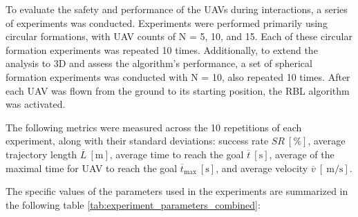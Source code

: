         To evaluate the safety and performance of the \ac{UAV}s during interactions, a series of experiments was conducted. 
        Experiments were performed primarily using circular formations, with \ac{UAV} counts of N = 5, 10, and 15. 
        Each of these circular formation experiments was repeated 10 times.
        Additionally, to extend the analysis to 3D and assess the algorithm's performance, a set of spherical formation experiments was conducted with N = 10, also repeated 10 times.
        After each \ac{UAV} was flown from the ground to its starting position, the \ac{RBL} algorithm was activated.    
        
        The following metrics were measured across the 10 repetitions of each experiment, along with their standard deviations: success rate \( SR \ [\%] \), average trajectory length \( \overline{L} \ [\mathrm{m}] \), 
        average time to reach the goal \( \overline{t} \ [\mathrm{s}] \), average of the maximal time for \ac{UAV} to reach the goal \( \overline{t}_{\text{max}} \ [\mathrm{s}] \), and average velocity \( \overline{v} \ [\SI{}{\meter\per\second}] \).

        The specific values of the parameters used in the experiments are summarized in the following table \ref{tab:experiment_parameters_combined}:

